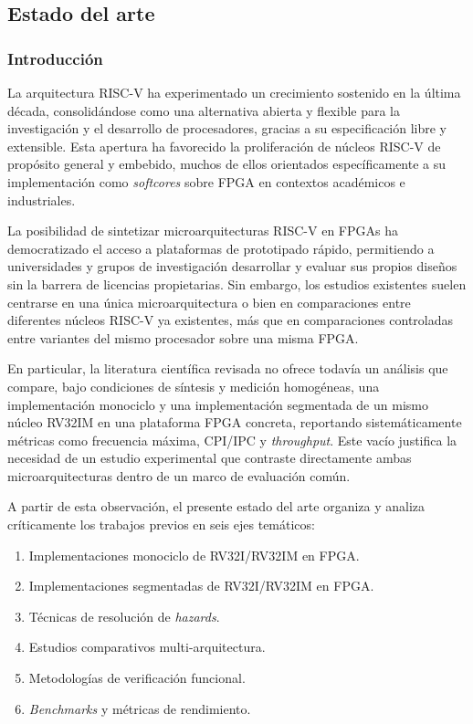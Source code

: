 \subsection{Estado del arte}

\subsubsection{Introducción}

La arquitectura RISC-V ha experimentado un crecimiento sostenido en la última
década, consolidándose como una alternativa abierta y flexible para la
investigación y el desarrollo de procesadores, gracias a su especificación
libre y extensible.\parencite{RISCV2019Manual,Patterson2017Computer}
Esta apertura ha favorecido la proliferación de núcleos RISC-V de propósito
general y embebido, muchos de ellos orientados específicamente a su
implementación como \emph{softcores} sobre FPGA en contextos académicos
e industriales.\parencite{Heinz2019Catalog}

La posibilidad de sintetizar microarquitecturas RISC-V en FPGAs ha
democratizado el acceso a plataformas de prototipado rápido, permitiendo a
universidades y grupos de investigación desarrollar y evaluar sus propios
diseños sin la barrera de licencias propietarias.\parencite{Wei2024NEORV32}
Sin embargo, los estudios existentes suelen centrarse en una única
microarquitectura o bien en comparaciones entre diferentes núcleos RISC-V
ya existentes, más que en comparaciones controladas entre variantes del
mismo procesador sobre una misma FPGA.

En particular, la literatura científica revisada no ofrece todavía un
análisis que compare, bajo condiciones de síntesis y medición homogéneas,
una implementación monociclo y una implementación segmentada de un mismo
núcleo RV32IM en una plataforma FPGA concreta, reportando sistemáticamente
métricas como frecuencia máxima, CPI/IPC y \emph{throughput}.
Este vacío justifica la necesidad de un estudio experimental que contraste
directamente ambas microarquitecturas dentro de un marco de evaluación
común.\parencite{Heinz2019Catalog,Lazzeri2024Comparison}

A partir de esta observación, el presente estado del arte organiza y analiza
críticamente los trabajos previos en seis ejes temáticos:
\begin{enumerate}
  \item Implementaciones monociclo de RV32I/RV32IM en FPGA.
  \item Implementaciones segmentadas de RV32I/RV32IM en FPGA.
  \item Técnicas de resolución de \emph{hazards}.
  \item Estudios comparativos multi-arquitectura.
  \item Metodologías de verificación funcional.
  \item \emph{Benchmarks} y métricas de rendimiento.
\end{enumerate}

